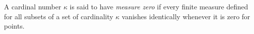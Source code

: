 A cardinal number $\kappa$ is said to have \textit{measure zero} if every finite measure defined for all subsets of a set of cardinality $\kappa$ vanishes identically whenever it is zero for points.
